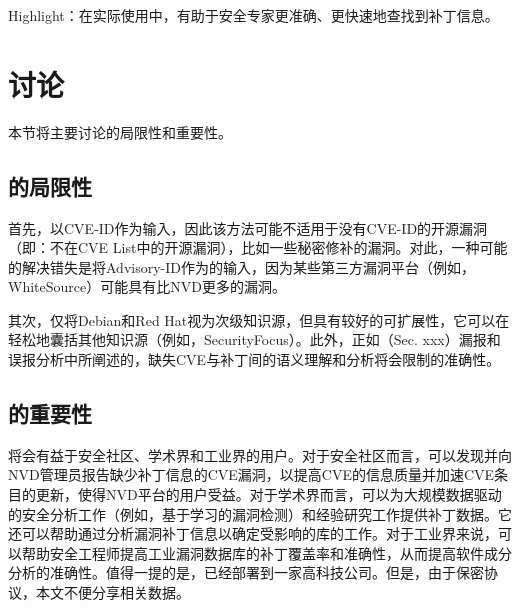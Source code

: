 \begin{tcolorbox}[size=title,opacityfill=0.15]
Highlight：在实际使用中，\tool 有助于安全专家更准确、更快速地查找到补丁信息。
\end{tcolorbox}

\section{讨论}
本节将主要讨论\tool 的局限性和重要性。
\subsection{\tool 的局限性}
首先，\tool 以CVE-ID作为输入，因此该方法可能不适用于没有CVE-ID的开源漏洞（即：不在CVE List中的开源漏洞），比如一些秘密修补的漏洞\cite{xu2017spain}。对此，一种可能的解决错失是将Advisory-ID作为\tool 的输入，因为某些第三方漏洞平台（例如，WhiteSource）可能具有比NVD更多的漏洞。

其次，\tool 仅将Debian和Red Hat视为次级知识源，但\tool 具有较好的可扩展性，它可以在轻松地囊括其他知识源（例如，SecurityFocus\cite{SecurityFocus}）。此外，正如（Sec. xxx）\tool 漏报和误报分析中所阐述的，缺失CVE与补丁间的语义理解和分析将会限制\tool 的准确性。%

\subsection{\tool 的重要性}
\tool 将会有益于安全社区、学术界和工业界的用户。对于安全社区而言，\tool 可以发现并向NVD管理员报告缺少补丁信息的CVE漏洞，以提高CVE的信息质量并加速CVE条目的更新，使得NVD平台的用户受益。对于学术界而言，\tool 可以为大规模数据驱动的安全分析工作（例如，基于学习的漏洞检测\cite{li2018vuldeepecker,zhou2019devign}）和经验研究工作提供补丁数据。它还可以帮助通过分析漏洞补丁信息以确定受影响的库的工作\cite{dong2019towards}。对于工业界来说，\tool 可以帮助安全工程师提高工业漏洞数据库的补丁覆盖率和准确性，从而提高软件成分分析的准确性。值得一提的是，\tool 已经部署到一家高科技公司。但是，由于保密协议，本文不便分享相关数据。